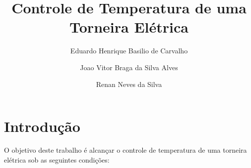 \documentclass[conference,harvard,brazil,english]{sbatex}
\begin{document}
\title{Controle de Temperatura de uma Torneira Elétrica}

\author{Eduardo Henrique Basilio de Carvalho}
\author{Joao Vitor Braga da Silva Alves}
\author{Renan Neves da Silva}

\maketitle


\section{Introdução}

O objetivo deste trabalho é alcançar o controle de temperatura de uma torneira elétrica sob as seguintes condições:
\end{document}

